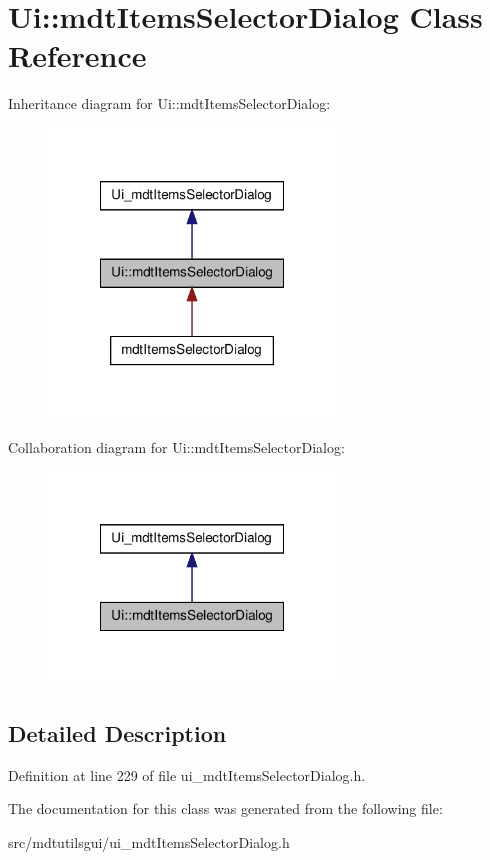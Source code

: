 \hypertarget{class_ui_1_1mdt_items_selector_dialog}{
\section{Ui::mdtItemsSelectorDialog Class Reference}
\label{class_ui_1_1mdt_items_selector_dialog}
}


Inheritance diagram for Ui::mdtItemsSelectorDialog:\nopagebreak
\begin{figure}[H]
\begin{center}
\leavevmode
\includegraphics[width=216pt]{class_ui_1_1mdt_items_selector_dialog__inherit__graph}
\end{center}
\end{figure}


Collaboration diagram for Ui::mdtItemsSelectorDialog:\nopagebreak
\begin{figure}[H]
\begin{center}
\leavevmode
\includegraphics[width=216pt]{class_ui_1_1mdt_items_selector_dialog__coll__graph}
\end{center}
\end{figure}


\subsection{Detailed Description}


Definition at line 229 of file ui\_\-mdtItemsSelectorDialog.h.



The documentation for this class was generated from the following file:\begin{DoxyCompactItemize}
\item 
src/mdtutilsgui/ui\_\-mdtItemsSelectorDialog.h\end{DoxyCompactItemize}
